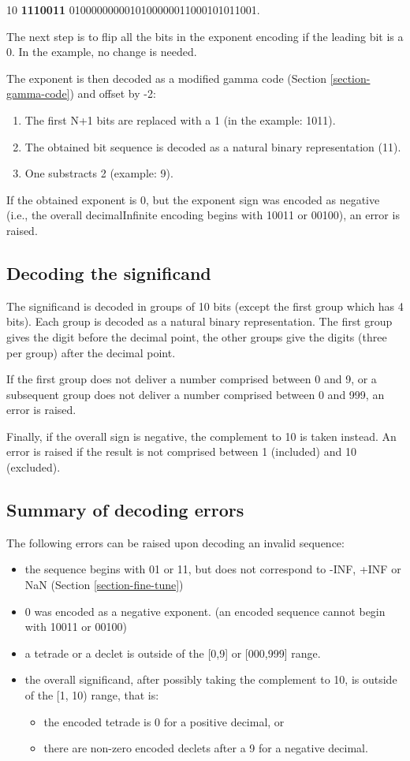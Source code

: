 \documentclass{acm_proc_article-sp}
\begin{document}
10 \textbf{1110011} 0100000000010100000011000101011001.

The next step is to flip all the bits in the exponent encoding if the leading bit is a 0. In the example, no change is needed.

The exponent is then decoded as a modified gamma code (Section \ref{section-gamma-code}) and offset by -2:

\begin{enumerate}
\item The first N+1 bits are replaced with a 1 (in the example: 1011).
\item The obtained bit sequence is decoded as a natural binary representation (11).
\item One substracts 2 (example: 9).
\end{enumerate}

If the obtained exponent is 0, but the exponent sign was encoded as negative (i.e., the overall decimalInfinite encoding begins with 10011 or 00100), an error is raised.

\subsection{Decoding the significand}

The significand is decoded in groups of 10 bits (except the first group which has 4 bits). Each group is decoded as a natural binary representation. The first group gives the digit before the decimal point, the other groups give the digits (three per group) after the decimal point.

If the first group does not deliver a number comprised between 0 and 9, or a subsequent group does not deliver a number comprised between 0 and 999, an error is raised.

Finally, if the overall sign is negative, the complement to 10 is taken instead. An error is raised if the result is not comprised between 1 (included) and 10 (excluded).

\subsection{Summary of decoding errors}
The following errors can be raised upon decoding an invalid sequence:
\begin{itemize}
\item the sequence begins with 01 or 11, but does not correspond to -INF, +INF or NaN (Section \ref{section-fine-tune})
\item 0 was encoded as a negative exponent. (an encoded sequence cannot begin with 10011 or 00100)
\item a tetrade or a declet is outside of the [0,9] or [000,999] range.
\item the overall significand, after possibly taking the complement to 10, is outside of the [1, 10) range, that is:
\begin{itemize}
\item the encoded tetrade is 0 for a positive decimal, or
\item there are non-zero encoded declets after a 9 for a negative decimal.
\end{itemize}
\end{itemize}
\end{document}
